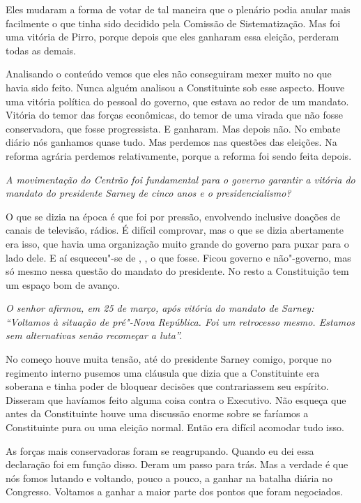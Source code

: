 Eles mudaram a forma de votar de tal maneira que o plenário podia anular
mais facilmente o que tinha sido decidido pela Comissão de
Sistematização. Mas foi uma vitória de Pirro, porque depois que eles
ganharam essa eleição, perderam todas as demais.

Analisando o conteúdo vemos que eles não conseguiram mexer muito no que
havia sido feito. Nunca alguém analisou a Constituinte sob esse aspecto.
Houve uma vitória política do pessoal do governo, que estava ao redor de
um mandato. Vitória do temor das forças econômicas, do temor de uma
virada que não fosse conservadora, que fosse progressista. E ganharam.
Mas depois não. No embate diário nós ganhamos quase tudo. Mas perdemos
nas questões das eleições. Na reforma agrária perdemos relativamente,
porque a reforma foi sendo feita depois.

\medskip

\noindent\emph{A movimentação do Centrão foi fundamental para o governo
garantir a vitória do mandato do presidente Sarney de cinco anos e o
presidencialismo?}

O que se dizia na época é que foi por pressão, envolvendo
inclusive doações de canais de televisão, rádios. É difícil comprovar,
mas o que se dizia abertamente era isso, que havia uma organização muito
grande do governo para puxar para o lado dele. E aí esqueceu"-se de ,
, o que fosse. Ficou governo e não"-governo, mas só mesmo nessa
questão do mandato do presidente. No resto a Constituição tem um espaço
bom de avanço.

\medskip

\noindent\emph{O senhor afirmou, em 25 de março, após vitória do mandato de
Sarney: ``Voltamos à situação de pré"-Nova República. Foi um retrocesso
mesmo. Estamos sem alternativas senão recomeçar a luta''.}

No começo houve muita tensão, até do presidente Sarney
comigo, porque no regimento interno pusemos uma cláusula que dizia que a
Constituinte era soberana e tinha poder de bloquear decisões que
contrariassem seu espírito. Disseram que havíamos feito alguma coisa
contra o Executivo. Não esqueça que antes da Constituinte houve uma
discussão enorme sobre se faríamos a Constituinte pura ou uma eleição
normal. Então era difícil acomodar tudo isso.

As forças mais conservadoras foram se reagrupando. Quando eu dei essa
declaração foi em função disso. Deram um passo para trás. Mas a verdade
é que nós fomos lutando e voltando, pouco a pouco, a ganhar na batalha
diária no Congresso. Voltamos a ganhar a maior parte dos pontos que
foram negociados.

